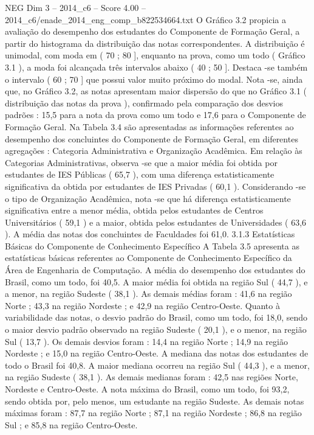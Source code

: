 \begin{textsample}{NEG Dim 3 – 2014\_c6 – Score 4.00 – 2014\_c6/enade\_2014\_eng\_comp\_b822534664.txt}
O Gráfico 3.2 propicia a avaliação do desempenho dos estudantes do Componente de Formação Geral, a partir do histograma da distribuição das notas correspondentes.
A distribuição é unimodal, com moda em ( 70 ; 80 ], enquanto na prova, como um todo ( Gráfico 3.1 ), a moda foi alcançada três intervalos abaixo ( 40 ; 50 ].
Destaca -se também o intervalo ( 60 ; 70 ] que possui valor muito próximo do modal.
Nota -se, ainda que, no Gráfico 3.2, as notas apresentam maior dispersão do que no Gráfico 3.1 ( distribuição das notas da prova ), confirmado pela comparação dos desvios padrões : 15,5 para a nota da prova como um todo e 17,6 para o Componente de Formação Geral.
Na Tabela 3.4 são apresentadas as informações referentes ao desempenho dos concluintes do Componente de Formação Geral, em diferentes agregações : Categoria Administrativa e Organização Acadêmica.
Em relação às Categorias Administrativas, observa -se que a maior média foi obtida por estudantes de IES Públicas ( 65,7 ), com uma diferença estatisticamente significativa da obtida por estudantes de IES Privadas ( 60,1 ).
Considerando -se o tipo de Organização Acadêmica, nota -se que há diferença estatisticamente significativa entre a menor média, obtida pelos estudantes de Centros Universitários ( 59,1 ) e a maior, obtida pelos estudantes de Universidades ( 63,6 ).
A média das notas dos concluintes de Faculdades foi 61,0. 3.1.3 Estatísticas Básicas do Componente de Conhecimento Específico A Tabela 3.5 apresenta as estatísticas básicas referentes ao Componente de Conhecimento Específico da Área de Engenharia de Computação.
A média do desempenho dos estudantes do Brasil, como um todo, foi 40,5.
A maior média foi obtida na região Sul ( 44,7 ), e a menor, na região Sudeste ( 38,1 ).
As demais médias foram : 41,6 na região Norte ; 43,3 na região Nordeste ; e 42,9 na região Centro-Oeste.
Quanto à variabilidade das notas, o desvio padrão do Brasil, como um todo, foi 18,0, sendo o maior desvio padrão observado na região Sudeste ( 20,1 ), e o menor, na região Sul ( 13,7 ).
Os demais desvios foram : 14,4 na região Norte ; 14,9 na região Nordeste ; e 15,0 na região Centro-Oeste.
A mediana das notas dos estudantes de todo o Brasil foi 40,8.
A maior mediana ocorreu na região Sul ( 44,3 ), e a menor, na região Sudeste ( 38,1 ).
As demais medianas foram : 42,5 nas regiões Norte, Nordeste e Centro-Oeste.
A nota máxima do Brasil, como um todo, foi 93,2, sendo obtida por, pelo menos, um estudante na região Sudeste.
As demais notas máximas foram : 87,7 na região Norte ; 87,1 na região Nordeste ; 86,8 na região Sul ; e 85,8 na região Centro-Oeste.

\end{textsample}
